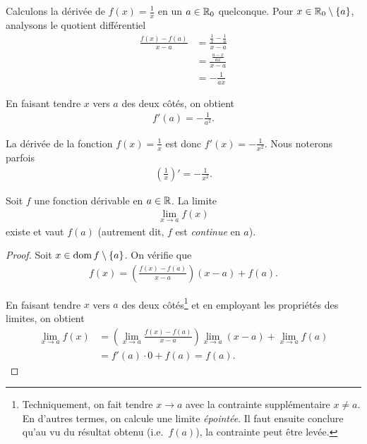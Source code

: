\documentclass[main.tex]{subfiles}
\begin{document}
\begin{example}

    Calculons la dérivée de $f(x) = \frac 1 x$ en un $a \in \mathbb{R}_0$ quelconque.
    Pour $x \in \mathbb{R}_0 \setminus \{a\}$,
    analysons le quotient différentiel
    \begin{align}
        \frac {f(x) - f(a)} {x - a}
        &= \frac {\frac 1 x - \frac 1 a}{x - a}\\
        &= \frac{\frac{a - x}{ax}}{x - a}\\
        &= - \frac {1}{ax}
    \end{align}

    En faisant tendre $x$ vers $a$ des deux côtés,
    on obtient
    \begin{align}
        f'(a) = - \frac {1} {a^2}.
    \end{align}
    
    La dérivée de la fonction $f(x) = \frac 1 x$ est donc $f'(x) = - \frac{1}{x^2}$.
    Nous noterons parfois
    \begin{align}
        \left(\frac 1 x\right)'=- \frac 1 {x^2}.
    \end{align}
\end{example}

\begin{proposition}

    Soit $f$ une fonction dérivable en $a \in \mathbb{R}$.
    La limite
    \begin{align}
        \lim_{x \to a} f(x)
    \end{align}
    existe et vaut $f(a)$
    (autrement dit, $f$ est \emph{continue} en $a$).
\end{proposition}
\begin{proof}
    Soit $x \in \operatorname{dom} f \setminus \{a\}$.
    On vérifie que
    \begin{align}
        f(x) = \left(\frac {f(x) - f(a)} {x - a}\right) (x - a) + f(a).
    \end{align}

    En faisant tendre $x$ vers $a$ des deux côtés\footnote{%
        Techniquement, on fait tendre $x \to a$ avec la contrainte supplémentaire $x \neq a$.
        En d'autres termes, on calcule une limite \emph{épointée}.
        Il faut ensuite conclure qu'au vu du résultat obtenu (i.e.\ $f(a)$),
        la contrainte peut être levée.
    }
    et en employant les propriétés des limites,
    on obtient
    \begin{align}
        \lim_{x \to a} f(x)
        &= \left(\lim_{x \to a} \frac {f(x) - f(a)} {x - a}\right) \lim_{x \to a} (x - a) + \lim_{x \to a} f(a)\\
        &= f'(a) \cdot 0 + f(a) = f(a).
    \end{align}
\end{proof}
\end{document}
